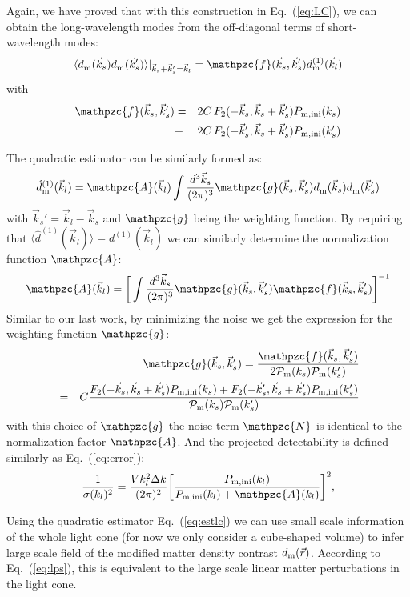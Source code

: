 \documentclass[prd,amsmath,amssymb,floatfix,superscriptaddress,nofootinbib,twocolumn]{revtex4-1}
\def\be{\begin{equation}}
\def\ee{\end{equation}}
\def\bea{\begin{eqnarray}}
\def\eea{\end{eqnarray}}
\newcommand{\vrr}{\vec{r}}
\newcommand{\vs}{\nonumber\\}
\newcommand{\vk}{\vec{k}}
\newcommand{\ec}[1]{Eq.~(\ref{eq:#1})}
\newcommand{\eql}[1]{\label{eq:#1}}
\newcommand{\rf}[1]{\ref{fig:#1}}
\newcommand{\sfig}[2]{
\texttt{[image: ../plots/\#1]}
        }
\newcommand{\Sfig}[2]{
   \begin{figure}[thbp]
   \begin{center}
    \sfig{../plots/#1.pdf}{\columnwidth}
    \caption{{\small #2}}
    \label{fig:#1}
     \end{center}
   \end{figure}
}
\begin{document}
Again, we have proved that with this construction in \ec{LC}, we can obtain the long-wavelength modes from the off-diagonal terms of short-wavelength modes:
\be 
\langle d^{}_{\rm m}(\vk_s)d^{}_{\rm m}(\vk_s') \rangle|_{\vk_s+\vk_s'=\vk_l} =\mathpzc{f}(\vec{k}_s,\vec{k}_s'){d}^{(1)}_{\rm m}(\vec{k}_l) \eql{2ptdd}
\ee 
with 
\bea
\mathpzc{f}(\vec{k}_s,\vec{k}_s')&=&2C\,F_2(-\vec{k}_s,\vec{k}_s+\vec{k}_s')P_{\rm m,ini}(k_s)\vs
&+&2C\,F_2(-\vec{k}_s',\vec{k}_s+\vec{k}_s')P_{\rm m,ini}(k_s')       
\eea 

The quadratic estimator can be similarly formed as:
\be
\hat{d}^{(1)}_{\rm m}(\vk_l)=\mathpzc{A}(\vk_l)\int \frac{d^{3}\vk_s}{(2\pi)^3} \mathpzc{g}(\vk_s,\vk_s')d^{}_{\rm m}(\vk_s)d^{}_{\rm m}(\vk_s') \eql{estlc}
\ee 
with $\vk_s' = \vk_l-\vk_s$ and $\mathpzc{g}$ being the weighting function. By requiring that $\langle \hat{d}^{(1)}(\vec{k}_l) \rangle={d}^{(1)}(\vec{k}_l)$ we can similarly determine the normalization function $\mathpzc{A}$:
\begin{eqnarray}
\mathpzc{A}(\vec{k}_l)=\bigg[\int \frac{d^3 \vec{k}_s}{(2\pi)^3} \mathpzc{g}(\vec{k}_s,\vec{k}_s')\mathpzc{f}(\vec{k}_s,\vec{k}_s')  \bigg]^{-1} \eql{a}
\end{eqnarray}
Similar to our last work, by minimizing the noise we get the expression for the weighting function $\mathpzc{g}$:
\begin{eqnarray}
&&\mathpzc{g}(\vec{k}_{s},\vec{k}_{s}')
=\frac{\mathpzc{f}(\vec{k}_{s},\vec{k}_{s}')}{2\mathcal{P}_{\rm m}(k_{s})\mathcal{P}_{\rm m}(k_{s}')}\vs
&=&C\frac{F_2(-\vec{k}_s,\vec{k}_s+\vec{k}_s')P_{\rm m,ini}(k_s)+F_2(-\vec{k}_s',\vec{k}_s+\vec{k}_s')P_{\rm m,ini}(k_s')}{\mathcal{P}_{\rm m}(k_{s})\mathcal{P}_{\rm m}(k_{s}')}\vs 
\end{eqnarray} 
with this choice of $\mathpzc{g}$ the noise term $\mathpzc{N}$ is identical to the normalization factor $\mathpzc{A}$. And the projected detectability is defined similarly as \ec{error}:
\be
\frac{1}{\sigma(k_l)^2}=\frac{V k_l^2 \Delta k }{(2\pi)^2}\bigg[\frac{P_{\rm m,ini}(k_l)}{P_{\rm m,ini}(k_l)+\mathpzc{A}(k_l) }\bigg]^2 \eql{error1},
\ee

Using the quadratic estimator \ec{estlc} we can use small scale information of the whole light cone (for now we only consider a cube-shaped volume) to infer large scale field of the modified matter density contrast $d_{\rm m}(\vrr)$. According to \ec{lps}, this is equivalent to the large scale linear matter perturbations in the light cone.
\end{document}
